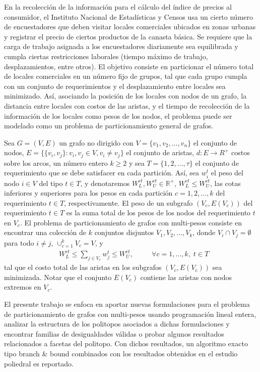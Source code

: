 \documentclass[a5paper,doc,10pt,noapacite]{apa6}
\begin{document}
{{En la recolección de la información para el cálculo del  índice de precios al consumidor, el Instituto Nacional de Estadísticas y Censos usa un cierto número de encuestadores que deben visitar locales comerciales ubicados en zonas urbanas y registrar el precio de ciertos productos de la canasta básica. Se requiere que la carga de trabajo asignada a los encuestadores diariamente sea equilibrada y cumpla ciertas restricciones laborales (tiempo máximo de trabajo, desplazamientos, entre otros). El objetivo consiste en particionar el número total de locales comerciales en un número fijo de grupos,  tal que cada grupo cumpla con un conjunto de requerimientos y el desplazamiento entre locales sea minimizado. Así, asociando la posición de los locales con nodos de un grafo, la distancia entre locales con costos de las aristas, y el tiempo de recolección de la información de los locales como pesos de los nodos, el problema puede ser modelado como un problema de particionamiento general de grafos.


Sea $G=(V,E)$ un grafo no dirigido con $V=\{v_1,v_2,\ldots,v_n\}$ el conjunto de nodos, $E=\{ \{v_i,v_j\}:v_i,v_j\in V,v_i\neq v_j \}$  el conjunto de aristas, $d:E\rightarrow R^+$ costos sobre los arcos, un número entero $k \geq 2$ y sea $T=\{1,2,\ldots,\tau\}$ el conjunto de requerimiento que se debe satisfacer en cada partición. Así, sea  $w_i^t$ el peso del nodo $i\in V$ del tipo $t\in T$, y denotaremos $W_L^{ct}, W_U^{ct} \in \mathbb{R}^+$, $W_L^{ct}\leq W_U^{ct}$, las cotas inferiores y superiores para los pesos en cada partición  $c=1,2,\ldots,k$ del requerimiento $t\in T$, respectivamente. El peso de un subgrafo $(V_c,E(V_c))$ del requerimiento  $t\in T$ es la suma total de los pesos de los nodos del requerimiento $t$ en $V_c$. El problema de particionamiento de grafos con multi-pesos consiste en encontrar una colección de $k$ conjuntos disjuntos $V_1,V_2,\ldots,V_k$, donde $V_i\cap V_j=\emptyset$ para todo $i\neq j$, $\cup_{c=1}^k V_c=V$, y 
  \begin{align*}
  & W_L^{ct} \leq \sum_{j\in V_c}w_j^t \leq W_U^{ct},& \quad & \forall
    c=1,\ldots,k,\; t\in T \label{cond_pesos}
  \end{align*}
 tal que el costo total de las aristas en los subgrafos $(V_c,E(V_c))$ sea minimizada.  Notar que el conjunto $E(V_c)$ contiene las aristas con nodos extremos en $V_c$. 

El presente trabajo se enfoca en aportar nuevas formulaciones  para el problema de particionamiento de grafos con multi-pesos usando programación lineal entera, analizar la estructura de los politopos asociados a dichas formulaciones y  encontrar familias de desigualdades válidas o probar algunos resultados relacionados a facetas del politopo. Con dichos resultados,  un algoritmo exacto tipo branch \& bound combinados con los resultados obtenidos en el estudio poliedral es reportado.}



}
\end{document}
